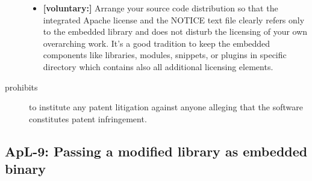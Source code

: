 \begin{description}
\begin{itemize}
  \item \textbf{[voluntary:]} Arrange your source code distribution so that the
  integrated Apache license and the NOTICE text file clearly refers only to the
  embedded library and does not disturb the licensing of your own overarching
  work. It's a good tradition to keep the embedded components like libraries,
  modules, snippets, or plugins in specific directory which contains also all
  additional licensing elements.
 
\end{itemize}

\item[prohibits] to institute any patent litigation against anyone alleging that
the software constitutes patent infringement.

\end{description}


\subsection{ApL-9: Passing a modified library as embedded binary}

